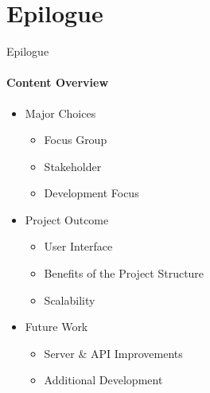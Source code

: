\author{Marc4Prez}
\section{Epilogue}
    \begin{frame}{Epilogue}\framesubtitle{Content Overview}
        \begin{itemize}
            \item<1-> Major Choices
            \begin{itemize}
                    \item<1-> Focus Group
                    \item<1-> Stakeholder 
                    \item<1-> Development Focus
            \end{itemize}
            \item<2-> Project Outcome
                \begin{itemize}
                    \item<2-> User Interface
                    \item<2-> Benefits of the Project Structure 
                    \item<2-> Scalability
                \end{itemize}
            \item<3-> Future Work
            \begin{itemize}
                \item<3-> Server \& API Improvements
                \item<3-> Additional Development
            \end{itemize}
        \end{itemize}
    \end{frame}

